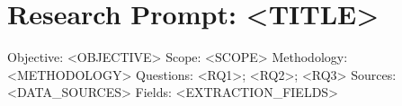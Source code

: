 \section*{Research Prompt: <TITLE>}
Objective: <OBJECTIVE>
Scope: <SCOPE>
Methodology: <METHODOLOGY>
Questions:
<RQ1>; <RQ2>; <RQ3>
Sources: <DATA_SOURCES>
Fields: <EXTRACTION_FIELDS>
